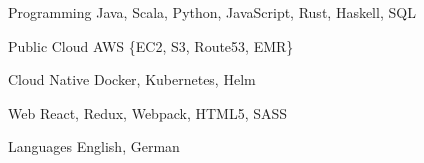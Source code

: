 


\begin{cvskills}


\cvskill
{Programming} %
{Java, Scala, Python, JavaScript, Rust, Haskell, SQL} %


\cvskill
{Public Cloud} %
  {AWS \{EC2, S3, Route53, EMR\}}

\cvskill
{Cloud Native} %
  {Docker, Kubernetes, Helm}

\cvskill
{Web} %
{React, Redux, Webpack, HTML5, SASS} %


\cvskill
{Languages} %
{English, German} %


\end{cvskills}

